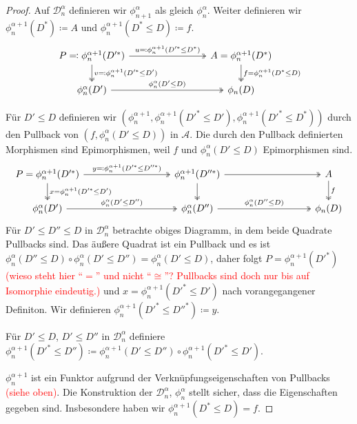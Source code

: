 \documentclass[a4paper, parskip=half]{scrartcl}
\theoremstyle{marginbreak}
\theoremstyle{nonumberplain}
\newtheorem{proof}{Beweis.}
\newcommand\cat\mathcal
\newcommand{\n}{\pgfmatrixnextcell}
\begin{document}
{\begin{proof}
			Auf $\cat{D}_n^\alpha$ definieren wir $\phi_{n+1}^\alpha$ als gleich
			$\phi_n^\alpha$. Weiter definieren wir $\phi_n^{\alpha+1}(D^*)\coloneqq A$
			und $\phi_n^{\alpha+1}(D^*\leq D)\coloneqq f$.
			\[
				\begin{tikzcd}[column sep=8em]
					P \eqqcolon \phi_n^{\alpha+1}(D'^*)
						\ar[two heads]{d}{v\eqqcolon \phi_n^{\alpha + 1}(D'^*\leq D')}
						\ar[two heads]{r}{u\eqqcolon \phi_n^{\alpha+1}(D'^*\leq D^*)}
					\n A=\phi_n^{\alpha+1}(D^*)
						\ar[two heads]{d}{f = \phi_n^{\alpha+1}(D^*\leq D)}\\
					\phi_n^\alpha(D') \ar[two heads]{r}{\phi_n^\alpha(D'\leq D)} \n \phi_n(D)
				\end{tikzcd}
			\]

			Für $D'\leq D$ definieren wir $(\phi_n^{\alpha+1}, \phi_n^{\alpha+1}(D'^*\leq D'),
			\phi_n^{\alpha+1}(D'^*\leq D^*))$ durch den Pullback
			von $(f, \phi_n^\alpha(D'\leq D))$ in $\cat{A}$. Die durch den Pullback
			definierten Morphismen sind Epimorphismen, weil $f$ und $\phi_n^\alpha(D'\leq D)$
			Epimorphismen sind.
			\[
				\begin{tikzcd}[column sep=9em]
					P=\phi_n^{\alpha+1}(D'^*)
						\ar[two heads]{d}{x=\phi_n^{\alpha+1}(D'^*\leq D')}
						\ar[two heads]{r}{y\eqqcolon \phi_n^{\alpha+1}(D'^*\leq D''^*)} \n
					\phi_n^{\alpha+1}(D''^*)
						\ar[two heads]{d}{}
						\ar[two heads]{r}{} \n
					A
						\ar[two heads]{d}{f} \\
					\phi_n^\alpha(D')
						\ar[two heads]{r}{\phi_n^\alpha(D'\leq D'')} \n
					\phi_n^\alpha(D'')
						\ar[two heads]{r}{\phi_n^\alpha(D''\leq D)} \n
					\phi_n(D)
				\end{tikzcd}
			\]
			Für $D'\leq D''\leq D$ in $\cat{D}_n^\alpha$ betrachte obiges Diagramm,
			in dem beide Quadrate Pullbacks sind. Das äußere Quadrat ist ein Pullback
			und es ist $\phi_n^\alpha(D''\leq D)\circ\phi_n^\alpha(D'\leq D'')=\phi_n^\alpha(D'\leq D)$,
			daher folgt $P=\phi_n^{\alpha+1}(D'^*)$
			\textcolor{red}{(wieso steht hier \enquote{$=$} und nicht \enquote{$\cong$}? Pullbacks sind doch nur
			bis auf Isomorphie eindeutig.)}
			und $x=\phi_n^{\alpha+1}(D'^*\leq D')$
			nach vorangegangener Definiton. Wir definieren $\phi_n^{\alpha+1}(D'^*\leq D''^*)\coloneqq y$.

			Für $D'\leq D$, $D'\leq D''$ in $\cat{D}_n^\alpha$ definiere
			$\phi_n^{\alpha+1}(D'^*\leq D'')\coloneqq \phi_n^{\alpha+1}(D'\leq D'')
			\circ\phi_n^{\alpha+1}(D'^*\leq D')$.

			$\phi_n^{\alpha+1}$ ist ein Funktor aufgrund der Verknüpfungseigenschaften
			von Pullbacks \textcolor{red}{(siehe oben)}.
			Die Konstruktion der $\cat{D}_n^\alpha$, $\phi_n^\alpha$ stellt sicher,
			dass die Eigenschaften gegeben sind. Insbesondere haben wir
			$\phi_n^{\alpha+1}(D^*\leq D)=f$.


\end{proof}}
\end{document}
